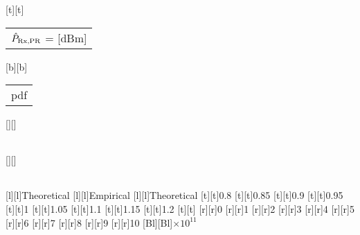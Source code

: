 %    
%
%
%
[t][t]{\fontsize{8}{12}\selectfont \color[rgb]{0.15,0.15,0.15}\setlength{\tabcolsep}{0pt}\begin{tabular}{c}$\hat{P}_{\text{Rx,PR}}$ = [dBm]\end{tabular}}%
[b][b]{\fontsize{8}{12}\selectfont \color[rgb]{0,0,0}\setlength{\tabcolsep}{0pt}\begin{tabular}{c}pdf\end{tabular}}%
[][]{\fontsize{10}{15}\selectfont \color[rgb]{0,0,0}\setlength{\tabcolsep}{0pt}\begin{tabular}{c} \end{tabular}}%
[][]{\fontsize{10}{15}\selectfont \color[rgb]{0,0,0}\setlength{\tabcolsep}{0pt}\begin{tabular}{c} \end{tabular}}%
[l][l]{\fontsize{8}{12}\selectfont \color[rgb]{0,0,0}Theoretical}%
[l][l]{\fontsize{8}{12}\selectfont \color[rgb]{0,0,0}Empirical}%
[l][l]{\fontsize{8}{12}\selectfont \color[rgb]{0,0,0}Theoretical}%
%
\fontsize{8}{12}%
\selectfont%
%
[t][t]{0.8}%
[t][t]{0.85}%
[t][t]{0.9}%
[t][t]{0.95}%
[t][t]{1}%
[t][t]{1.05}%
[t][t]{1.1}%
[t][t]{1.15}%
[t][t]{1.2}%
[t][t]{}%
%
[r][r]{0}%
[r][r]{1}%
[r][r]{2}%
[r][r]{3}%
[r][r]{4}%
[r][r]{5}%
[r][r]{6}%
[r][r]{7}%
[r][r]{8}%
[r][r]{9}%
[r][r]{10}%
[Bl][Bl]{$\times 10^{11}$}%
%
%
